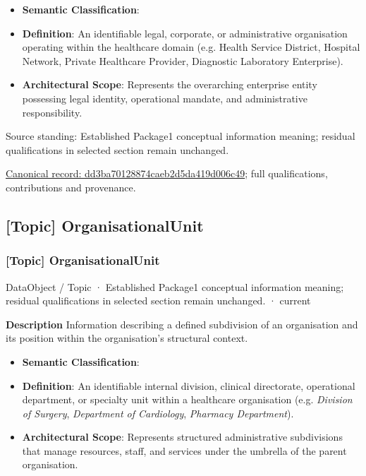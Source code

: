 \begin{itemize}


\item \textbf{Semantic Classification}: \texttt{}

\item \textbf{Definition}: An identifiable legal, corporate, or administrative organisation operating within the healthcare domain (e.g. Health Service District, Hospital Network, Private Healthcare Provider, Diagnostic Laboratory Enterprise).

\item \textbf{Architectural Scope}: Represents the overarching enterprise entity possessing legal identity, operational mandate, and administrative responsibility.

\end{itemize}


Source standing: Established Package1 conceptual information meaning; residual qualifications in selected section remain unchanged.


{\footnotesize \href{../../../../continuum/application/data-object/topic/dd3ba70128874caeb2d5da419d006c49.md}{Canonical record: dd3ba70128874caeb2d5da419d006c49}; full qualifications, contributions and provenance.}\par
\subsection{[Topic] OrganisationalUnit}

\subsubsection{[Topic] OrganisationalUnit}

\label{element:2c884cdd6a4b41a184818e3a7e540897}
{\small DataObject / Topic · Established Package1 conceptual information meaning; residual qualifications in selected section remain unchanged. · current}\par

\textbf{Description}
Information describing a defined subdivision of an organisation and its position within the organisation's structural context.



\begin{itemize}


\item \textbf{Semantic Classification}: \texttt{}

\item \textbf{Definition}: An identifiable internal division, clinical directorate, operational department, or specialty unit within a healthcare organisation (e.g. \emph{Division of Surgery}, \emph{Department of Cardiology}, \emph{Pharmacy Department}).

\item \textbf{Architectural Scope}: Represents structured administrative subdivisions that manage resources, staff, and services under the umbrella of the parent organisation.

\end{itemize}


